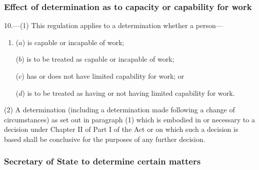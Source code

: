 \documentclass[12pt,a4paper]{article}
\begin{document}

%

\subsubsection[10. Effect of determination as to capacity or capability for work]{Effect of determination as to capacity or capability for work}

10.---(1)  This regulation applies to a determination whether a person—
\begin{enumerate}\item[]
($a$) is capable or incapable of work;

($b$) is to be treated as capable or incapable of work;

($c$) has or does not have limited capability for work; or

($d$) is to be treated as having or not having limited capability for work.
\end{enumerate}

(2) A determination (including a determination made following a change of circumstances) as set out in paragraph (1) which is embodied in or necessary to a decision under Chapter II of Part I of the Act or on which such a decision is based shall be conclusive for the purposes of any further decision.


\subsubsection[11. Secretary of State to determine certain matters]{Secretary of State to determine certain matters}
\end{document}
